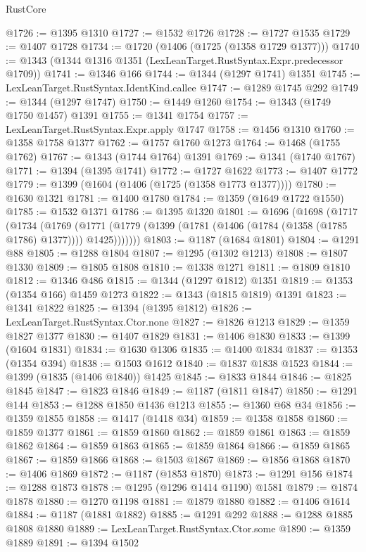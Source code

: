 \begin{lexlean}{RustCore}
\begin{coremodule}
@1726 := @1395 @1310
@1727 := @1532 @1726
@1728 := @1727 @1535
@1729 := @1407 @1728
@1734 := @1720 (@1406 (@1725 (@1358 @1729 @1377)))
@1740 := @1343 (@1344 @1316 @1351 (LexLeanTarget.RustSyntax.Expr.predecessor @1709))
@1741 := @1346 @166
@1744 := @1344 (@1297 @1741) @1351
@1745 := LexLeanTarget.RustSyntax.IdentKind.callee
@1747 := @1289 @1745 @292
@1749 := @1344 (@1297 @1747)
@1750 := @1449 @1260
@1754 := @1343 (@1749 @1750 @1457) @1391
@1755 := @1341 @1754
@1757 := LexLeanTarget.RustSyntax.Expr.apply @1747
@1758 := @1456 @1310
@1760 := @1358 @1758 @1377
@1762 := @1757 @1760 @1273
@1764 := @1468 (@1755 @1762)
@1767 := @1343 (@1744 @1764) @1391
@1769 := @1341 (@1740 @1767)
@1771 := @1394 (@1395 @1741)
@1772 := @1727 @1622
@1773 := @1407 @1772
@1779 := @1399 (@1604 (@1406 (@1725 (@1358 @1773 @1377))))
@1780 := @1630 @1321
@1781 := @1400 @1780
@1784 := @1359 (@1649 @1722 @1550)
@1785 := @1532 @1371
@1786 := @1395 @1320
@1801 := @1696
    (@1698
      (@1717
        (@1734
          (@1769
            (@1771 (@1779 (@1399 (@1781 (@1406 (@1784 (@1358 (@1785 @1786) @1377)))) @1425)))))))
@1803 := @1187 (@1684 @1801)
@1804 := @1291 @88
@1805 := @1288 @1804
@1807 := @1295 (@1302 @1213)
@1808 := @1807 @1330
@1809 := @1805 @1808
@1810 := @1338 @1271
@1811 := @1809 @1810
@1812 := @1346 @486
@1815 := @1344 (@1297 @1812) @1351
@1819 := @1353 (@1354 @166) @1459 @1273
@1822 := @1343 (@1815 @1819) @1391
@1823 := @1341 @1822
@1825 := @1394 (@1395 @1812)
@1826 := LexLeanTarget.RustSyntax.Ctor.none
@1827 := @1826 @1213
@1829 := @1359 @1827 @1377
@1830 := @1407 @1829
@1831 := @1406 @1830
@1833 := @1399 (@1604 @1831)
@1834 := @1630 @1306
@1835 := @1400 @1834
@1837 := @1353 (@1354 @394)
@1838 := @1503 @1612
@1840 := @1837 @1838 @1523
@1844 := @1399 (@1835 (@1406 @1840)) @1425
@1845 := @1833 @1844
@1846 := @1825 @1845
@1847 := @1823 @1846
@1849 := @1187 (@1811 @1847)
@1850 := @1291 @144
@1853 := @1288 @1850 @1436 @1213
@1855 := @1360 @68 @34
@1856 := @1359 @1855
@1858 := @1417 (@1418 @34)
@1859 := @1358 @1858
@1860 := @1859 @1377
@1861 := @1859 @1860
@1862 := @1859 @1861
@1863 := @1859 @1862
@1864 := @1859 @1863
@1865 := @1859 @1864
@1866 := @1859 @1865
@1867 := @1859 @1866
@1868 := @1503 @1867
@1869 := @1856 @1868
@1870 := @1406 @1869
@1872 := @1187 (@1853 @1870)
@1873 := @1291 @156
@1874 := @1288 @1873
@1878 := @1295 (@1296 @1414 @1190) @1581
@1879 := @1874 @1878
@1880 := @1270 @1198
@1881 := @1879 @1880
@1882 := @1406 @1614
@1884 := @1187 (@1881 @1882)
@1885 := @1291 @292
@1888 := @1288 @1885 @1808 @1880
@1889 := LexLeanTarget.RustSyntax.Ctor.some
@1890 := @1359 @1889
@1891 := @1394 @1502

\end{coremodule}
\end{lexlean}
